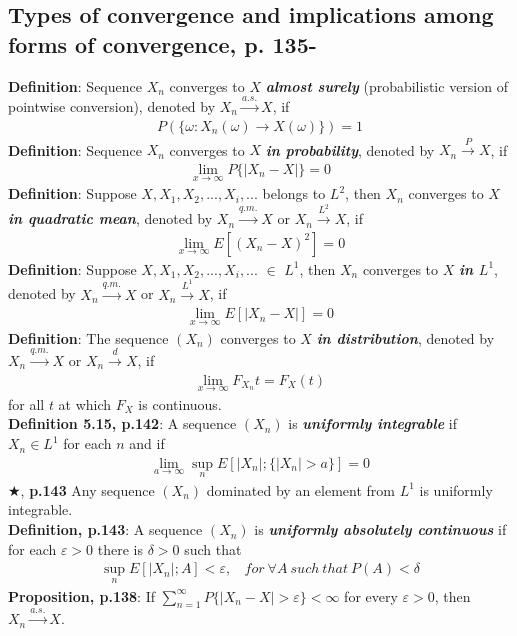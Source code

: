 \documentclass[]{article}
\begin{document}
\subsection{Types of convergence and implications among forms of convergence, p. 135-}
\textbf{Definition}: Sequence $X_n$ converges to $X$ \textbf{\textit{almost surely}} (probabilistic version of pointwise conversion), denoted by $X_n\xrightarrow{a.s.}X$, if
$$
\begin{aligned}
	P(\{ \omega: X_n(\omega) \rightarrow X(\omega) \})=1
	\end{aligned}
$$
\textbf{Definition}: Sequence $X_n$ converges to $X$ \textbf{\textit{in probability}}, denoted by $X_n\xrightarrow{P}X$, if
$$
\begin{aligned}
	\lim_{x\rightarrow \infty}P\{|X_n - X|\}=0
	\end{aligned}
$$
\textbf{Definition}: Suppose $X,X_1,X_2,...,X_i,...$ belongs to $L^2$, then $X_n$ converges to $X$ \textbf{\textit{in quadratic mean}}, denoted by $X_n\xrightarrow{q.m.}X$ or $X_n\xrightarrow{L^2}X$, if
$$
\begin{aligned}
	\lim_{x\rightarrow \infty}E[(X_n - X)^2]=0
	\end{aligned}
$$
\textbf{Definition}: Suppose $X,X_1,X_2,...,X_i,...$ $\in$ $L^1$, then $X_n$ converges to $X$ \textbf{\textit{in $L^1$}}, denoted by $X_n\xrightarrow{q.m.}X$ or $X_n\xrightarrow{L^1}X$, if
$$
\begin{aligned}
	\lim_{x\rightarrow \infty}E[|X_n - X|]=0
	\end{aligned}
$$
\textbf{Definition}: The sequence $(X_n)$ converges to $X$ \textbf{\textit{in distribution}}, denoted by $X_n\xrightarrow{q.m.}X$ or $X_n\xrightarrow{d}X$, if
$$
\begin{aligned}
	\lim_{x\rightarrow \infty}F_{X_n}{t}=F_X(t)
	\end{aligned}
$$
for all $t$ at which $F_X$ is continuous.\\
\textbf{Definition 5.15, p.142}: A sequence $(X_n)$ is \textbf{\textit{uniformly integrable}} if $X_n \in L^1$ for each $n$ and if
$$
\begin{aligned}
	\lim_{a\rightarrow \infty} \sup_n E[|X_n|; \{|X_n|>a\}] = 0
\end{aligned}
$$
$\bigstar$, \textbf{p.143} Any sequence $(X_n)$ dominated by an element from $L^1$ is uniformly integrable.\\
\textbf{Definition, p.143}: A sequence $(X_n)$ is \textbf{\textit{uniformly absolutely continuous}} if for each $\varepsilon >0$ there is $\delta >0$ such that
$$
\begin{aligned}
	\sup_n E[|X_n|; A] < \varepsilon,~~~~for~\forall A~such~that~P(A)< \delta
\end{aligned}
$$
\textbf{Proposition, p.138}: If $\sum_{n=1}^{\infty} P\{ |X_n - X|>\varepsilon \} < \infty$ for every $\varepsilon > 0$, then $X_n \overset{a.s.}{\longrightarrow} X$.
\end{document}
